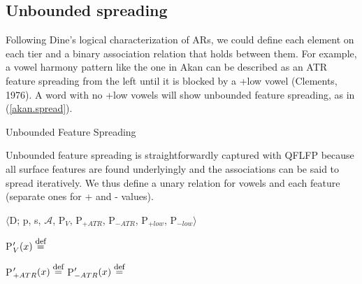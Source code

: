 \documentclass[,doc,floatsintext]{apa6}
\def\defeq{\mathrel{\buildrel \mbox{\footnotesize def} \over =}}
\theoremstyle{definition}
\theoremstyle{definition}
\theoremstyle{definition}
\theoremstyle{remark}
\begin{document}
\subsection{Unbounded spreading}\label{unbounded-spreading}

Following Dine's logical characterization of ARs, we could define each
element on each tier and a binary association relation that holds
between them. For example, a vowel harmony pattern like the one in Akan
can be described as an ATR feature spreading from the left until it is
blocked by a +low vowel (Clements, 1976). A word with no +low vowels
will show unbounded feature spreading, as in (\ref{akan.spread}).

\begin{exe}
\ex \label{akan.spread} Unbounded Feature Spreading \\
\end{exe}

\noindent Unbounded feature spreading is straightforwardly captured with
QFLFP because all surface features are found underlyingly and the
associations can be said to spread iteratively. We thus define a unary
relation for vowels and each feature (separate ones for + and - values).

\newpage

\begin{exe}
\ex\label{qflfp.spread} $\langle$D; p, s, $\mathcal{A}$, P$_V$, P$_{+ATR}$, P$_{-ATR}$, P$_{+low}$, P$_{-low}\rangle$ 
\end{exe}

P\('_{V}(x) \defeq\) \vspace{0.5in}

P\('_{+ATR}(x) \defeq\) \hspace{2.25in}
P\('_{-ATR}(x) \defeq\)\vspace{0.5in}
\end{document}
